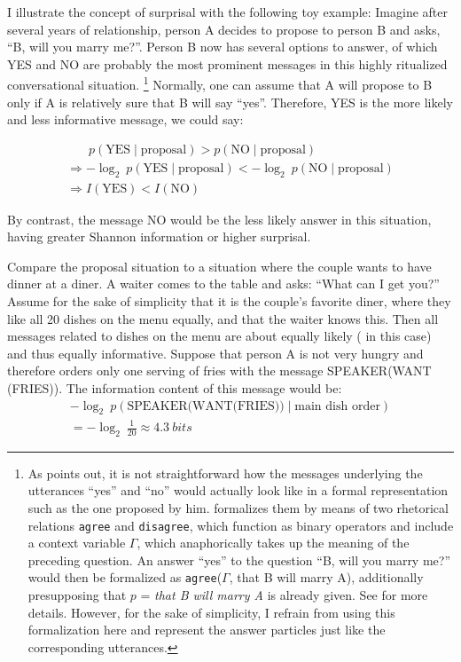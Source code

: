 I illustrate the concept of surprisal with the following toy example:
Imagine after several years of relationship, person A decides to propose to person B and asks, ``B, will you marry me?''.
Person B now has several options to answer, of which YES and NO are probably the most prominent messages in this highly ritualized conversational situation.%
\footnote{As \citet[90]{levelt1989} points out, it is not straightforward how the messages underlying the utterances ``yes'' and ``no'' would actually look like in a formal representation such as the one proposed by him.
\citet{reich2003} formalizes them by means of two rhetorical relations \texttt{agree} and \texttt{disagree}, which function as binary operators and include a context variable $\Gamma$, which anaphorically takes up the meaning of the preceding question.
An answer ``yes'' to the question ``B, will you marry me?'' would then be formalized as \texttt{agree}($\Gamma$, that B will marry A),  additionally presupposing that $p$ = \textit{that B will marry A} is already given.
See \citet[189--195]{reich2003} for more details.
However, for the sake of simplicity, I refrain from using this formalization here and represent the answer particles just like the corresponding utterances.}
%
Normally, one can assume that A will propose to B only if A is relatively sure that B will say ``yes''.
Therefore, YES is the more likely and less informative message, we could say:

\begin{equation}
\begin{gathered}
\phantom{\Rightarrow\ } p(\text{YES}\mathbin{|}\text{proposal}) >  p(\text{NO}\mathbin{|}\text{proposal})\\
\Rightarrow \mathbin{-}\log_{2}\ p(\text{YES}\mathbin{|}\text{proposal}) < \mathbin{-}\log_{2}\ p(\text{NO}\mathbin{|}\text{proposal})
\\
\Rightarrow I(\text{YES}) < I(\text{NO})
\end{gathered}
\end{equation}

\noindent
By contrast, the message NO would be the less likely answer in this situation, having greater Shannon information or higher surprisal.

Compare the proposal situation to a situation where the couple wants to have dinner at a diner.
A waiter comes to the table and asks: ``What can I get you?''
Assume for the sake of simplicity that it is the couple's favorite diner, where they like all 20 dishes on the menu equally, and that the waiter knows this.
Then all messages related to dishes on the menu are about equally likely ( in this case) and thus equally informative.
Suppose that person A is not very hungry and therefore orders only one serving of fries with the message SPEAKER(WANT (FRIES)).
The information content of this message would be:
\begin{equation}
\begin{gathered}
\mathbin{-}\log_{2}\ p(\text{SPEAKER(WANT(FRIES))}\mathbin{|}\text{main dish order}) \\
= \mathbin{-}\log_{2}\ \frac{1}{20} \approx 4.3\ bits
\end{gathered}
\end{equation}

